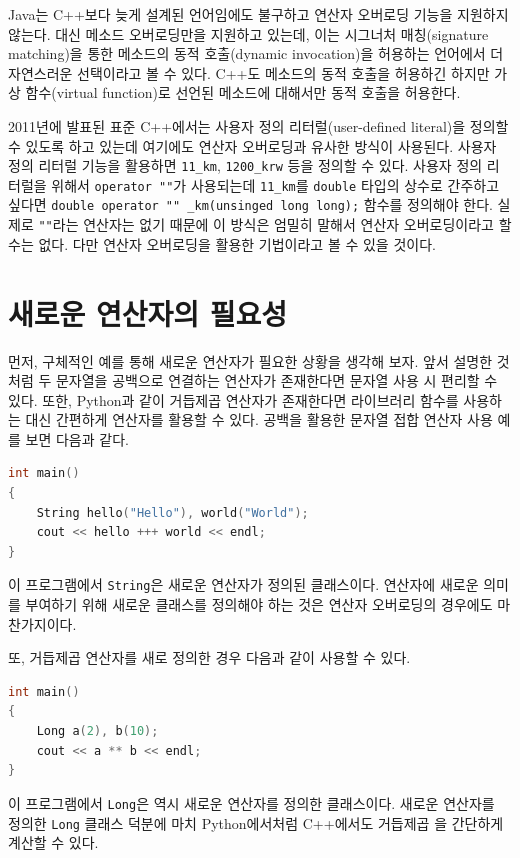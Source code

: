 \documentclass[titlepage]{pnureport}
\begin{document}
Java는 C++보다 늦게 설계된 언어임에도 불구하고 연산자 오버로딩 기능을 지원하지 않는다. 대신 메소드 오버로딩만을 지원하고 있는데, 이는 시그너처 매칭(signature matching)을 통한 메소드의 동적 호출(dynamic invocation)을 허용하는 언어에서 더 자연스러운 선택이라고 볼 수 있다. C++도 메소드의 동적 호출을 허용하긴 하지만 가상 함수(virtual function)로 선언된 메소드에 대해서만 동적 호출을 허용한다.

2011년에 발표된 표준 C++에서는 사용자 정의 리터럴(user-defined literal)을 정의할 수 있도록 하고 있는데\cite{stroustrup13} 여기에도 연산자 오버로딩과 유사한 방식이 사용된다. 사용자 정의 리터럴 기능을 활용하면 \verb|11_km|, \verb|1200_krw| 등을 정의할 수 있다. 사용자 정의 리터럴을 위해서 \verb|operator ""|가 사용되는데 \verb|11_km|를 \texttt{double} 타입의 상수로 간주하고 싶다면 \verb|double operator "" _km(unsinged long long);| 함수를 정의해야 한다. 실제로 \verb|""|라는 연산자는 없기 때문에 이 방식은 엄밀히 말해서 연산자 오버로딩이라고 할 수는 없다. 다만 연산자 오버로딩을 활용한 기법이라고 볼 수 있을 것이다.

\chapter{새로운 연산자의 필요성}
먼저, 구체적인 예를 통해 새로운 연산자가 필요한 상황을 생각해 보자. 앞서 설명한 것처럼 두 문자열을 공백으로 연결하는 연산자가 존재한다면 문자열 사용 시 편리할 수 있다. 또한, Python과 같이 거듭제곱 연산자가 존재한다면 라이브러리 함수를 사용하는 대신 간편하게 연산자를 활용할 수 있다. 공백을 활용한 문자열 접합 연산자 사용 예를 보면 다음과 같다. 


\begin{lstlisting}[language=c++,numbers=none]
int main()
{
    String hello("Hello"), world("World");
    cout << hello +++ world << endl;
}
\end{lstlisting}

이 프로그램에서 \texttt{String}은 새로운 연산자가 정의된 클래스이다. 연산자에 새로운 의미를 부여하기 위해 새로운 클래스를 정의해야 하는 것은 연산자 오버로딩의 경우에도 마찬가지이다.

또, 거듭제곱 연산자를 새로 정의한 경우 다음과 같이 사용할 수 있다.
\begin{lstlisting}[language=c++,numbers=none]
int main()
{
    Long a(2), b(10);
    cout << a ** b << endl;
}
\end{lstlisting}
이 프로그램에서 \texttt{Long}은 역시 새로운 연산자를 정의한 클래스이다. 새로운 연산자를 정의한 \texttt{Long} 클래스 덕분에 마치 Python에서처럼 C++에서도 거듭제곱 을 간단하게 계산할 수 있다.
\end{document}
